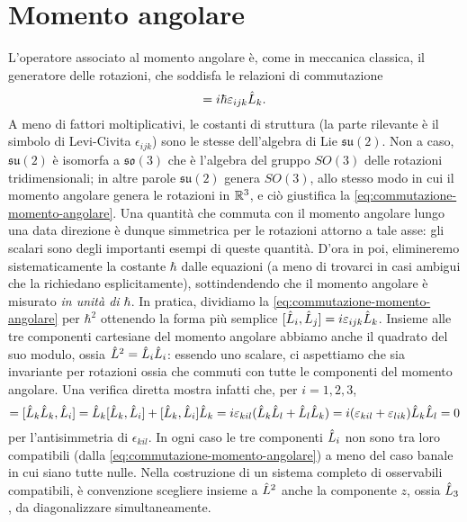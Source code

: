 \chapter{Momento angolare}
L'operatore associato al momento angolare è, come in meccanica classica, il generatore delle rotazioni, che soddisfa le relazioni di commutazione
\begin{equation}
	[\op L_i,\op L_j]=i\hbar\epsilon_{ijk}\op L_k.
	\label{eq:commutazione-momento-angolare}
\end{equation}
A meno di fattori moltiplicativi, le costanti di struttura (la parte rilevante è il simbolo di Levi-Civita $\epsilon_{ijk}$) sono le stesse dell'algebra di Lie $\mathfrak{su}(2)$.
Non a caso, $\mathfrak{su}(2)$ è isomorfa a $\mathfrak{so}(3)$ che è l'algebra del gruppo $SO(3)$ delle rotazioni tridimensionali; in altre parole $\mathfrak{su}(2)$ genera $SO(3)$, allo stesso modo in cui il momento angolare genera le rotazioni in $\mathbb{R}^3$, e ciò giustifica la \eqref{eq:commutazione-momento-angolare}.
Una quantità che commuta con il momento angolare lungo una data direzione è dunque simmetrica per le rotazioni attorno a tale asse: gli scalari sono degli importanti esempi di queste quantità.
D'ora in poi, elimineremo sistematicamente la costante $\hbar$ dalle equazioni (a meno di trovarci in casi ambigui che la richiedano esplicitamente), sottindendendo che il momento angolare è misurato \emph{in unità di $\hbar$}.
In pratica, dividiamo la \eqref{eq:commutazione-momento-angolare} per $\hbar^2$ ottenendo la forma più semplice $[\hat{L}_i,\hat{L}_j]=i\varepsilon_{ijk}\hat{L}_k$.
Insieme alle tre componenti cartesiane del momento angolare abbiamo anche il quadrato del suo modulo, ossia $\hat{L}^2=\hat{L}_i\hat{L}_i$: essendo uno scalare, ci aspettiamo che sia invariante per rotazioni ossia che commuti con tutte le componenti del momento angolare.
Una verifica diretta mostra infatti che, per $i=1,2,3$,
\begin{equation}
	[\op L^2,\op L_i]=[\op L_k\op L_k,\op L_i]=\op L_k[\op L_k,\op L_i]+[\op L_k,\op L_i]\op L_k=i\epsilon_{kil}(\op L_k\op L_l+\op L_l\op L_k)=i(\epsilon_{kil}+\epsilon_{lik})\op L_k\op L_l=0
\end{equation}
per l'antisimmetria di $\epsilon_{kil}$.
In ogni caso le tre componenti $\hat{L}_i$ non sono tra loro compatibili (dalla \eqref{eq:commutazione-momento-angolare}) a meno del caso banale in cui siano tutte nulle.
Nella costruzione di un sistema completo di osservabili compatibili, è convenzione scegliere insieme a $\hat{L}^2$ anche la componente $z$, ossia $\hat{L}_3$, da diagonalizzare simultaneamente.

